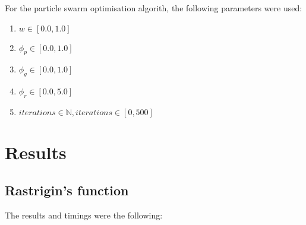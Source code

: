 \documentclass[conference]{IEEEtran}
\begin{document}
For the particle swarm optimisation algorith, the following parameters were used:

\begin{enumerate}
    \item $w \in [0.0, 1.0]$
    \item $\phi_p \in [0.0, 1.0]$
    \item $\phi_g \in [0.0, 1.0]$
    \item $\phi_r \in [0.0, 5.0]$
    \item $iterations \in \mathbb{N}, iterations \in [0, 500]$
\end{enumerate}

\section{Results}

\subsection{Rastrigin's function}
The results and timings were the following:
\end{document}
